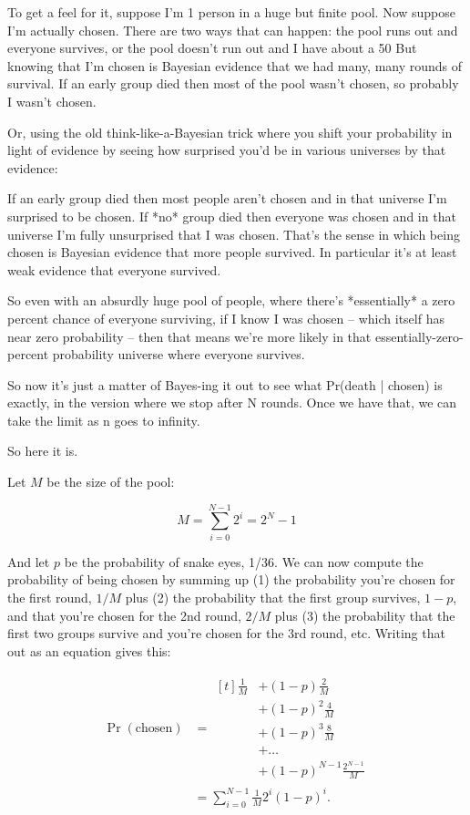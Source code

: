 \documentclass[article,twocolumn]{memoir}
\begin{document}
To get a feel for it, suppose I'm 1 person in a huge but finite pool. 
Now suppose I'm actually chosen. 
There are two ways that can happen: 
the pool runs out and everyone survives, or 
the pool doesn't run out and I have about a 50%
But knowing that I'm chosen is Bayesian evidence that we had many, many rounds of survival. 
If an early group died then most of the pool wasn't chosen, so probably I wasn't chosen.

Or, using the old think-like-a-Bayesian trick where you shift your probability in light of evidence by seeing how surprised you'd be in various universes by that evidence:

If an early group died then most people aren't chosen and in that universe I'm surprised to be chosen. 
If *no* group died then everyone was chosen and in that universe I'm fully unsurprised that I was chosen. 
That's the sense in which being chosen is Bayesian evidence that more people survived. 
In particular it's at least weak evidence that everyone survived.

So even with an absurdly huge pool of people, where there's *essentially* a zero percent chance of everyone surviving, if I know I was chosen -- which itself has near zero probability -- then that means we're more likely in that essentially-zero-percent probability universe where everyone survives.

So now it's just a matter of Bayes-ing it out to see what Pr(death | chosen) is exactly, in the version where we stop after N rounds.
Once we have that, we can take the limit as n goes to infinity.

So here it is.

Let $M$ be the size of the pool:

$$M = \sum_{i=0}^{N-1} 2^i = 2^N-1$$

And let $p$ be the probability of snake eyes, 1/36.
We can now compute the probability of being chosen by summing up 
(1) the probability you're chosen for the first round, $1/M$ plus 
(2) the probability that the first group survives, $1-p$, and that you're chosen for the 2nd round, $2/M$ plus 
(3) the probability that the first two groups survive and you're chosen for the 3rd round, etc.
Writing that out as an equation gives this:

\begin{align*}
\Pr(\text{chosen}) & = 
\begin{aligned}[t]
\tfrac{1}{M} & + (1-p)\tfrac{2}{M} \\
& + (1-p)^2\tfrac{4}{M} \\
& + (1-p)^3\tfrac{8}{M} \\
& + \ldots \\
& + (1-p)^{N-1}\frac{2^{N-1}}{M}
\end{aligned} \\
& = \sum_{i=0}^{N-1} \tfrac{1}{M} 2^i(1-p)^i.
\end{align*}
\end{document}
